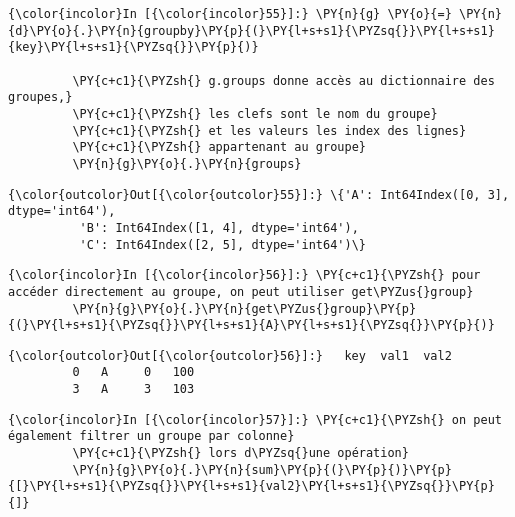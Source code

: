     \begin{Verbatim}[commandchars=\\\{\},frame=single,framerule=0.3mm,rulecolor=\color{cellframecolor}]
{\color{incolor}In [{\color{incolor}55}]:} \PY{n}{g} \PY{o}{=} \PY{n}{d}\PY{o}{.}\PY{n}{groupby}\PY{p}{(}\PY{l+s+s1}{\PYZsq{}}\PY{l+s+s1}{key}\PY{l+s+s1}{\PYZsq{}}\PY{p}{)}
         
         \PY{c+c1}{\PYZsh{} g.groups donne accès au dictionnaire des groupes,}
         \PY{c+c1}{\PYZsh{} les clefs sont le nom du groupe}
         \PY{c+c1}{\PYZsh{} et les valeurs les index des lignes}
         \PY{c+c1}{\PYZsh{} appartenant au groupe}
         \PY{n}{g}\PY{o}{.}\PY{n}{groups}
\end{Verbatim}


\begin{Verbatim}[commandchars=\\\{\},frame=single,framerule=0.3mm,rulecolor=\color{cellframecolor}]
{\color{outcolor}Out[{\color{outcolor}55}]:} \{'A': Int64Index([0, 3], dtype='int64'),
          'B': Int64Index([1, 4], dtype='int64'),
          'C': Int64Index([2, 5], dtype='int64')\}
\end{Verbatim}
            
    \begin{Verbatim}[commandchars=\\\{\},frame=single,framerule=0.3mm,rulecolor=\color{cellframecolor}]
{\color{incolor}In [{\color{incolor}56}]:} \PY{c+c1}{\PYZsh{} pour accéder directement au groupe, on peut utiliser get\PYZus{}group}
         \PY{n}{g}\PY{o}{.}\PY{n}{get\PYZus{}group}\PY{p}{(}\PY{l+s+s1}{\PYZsq{}}\PY{l+s+s1}{A}\PY{l+s+s1}{\PYZsq{}}\PY{p}{)}
\end{Verbatim}


\begin{Verbatim}[commandchars=\\\{\},frame=single,framerule=0.3mm,rulecolor=\color{cellframecolor}]
{\color{outcolor}Out[{\color{outcolor}56}]:}   key  val1  val2
         0   A     0   100
         3   A     3   103
\end{Verbatim}
            
    \begin{Verbatim}[commandchars=\\\{\},frame=single,framerule=0.3mm,rulecolor=\color{cellframecolor}]
{\color{incolor}In [{\color{incolor}57}]:} \PY{c+c1}{\PYZsh{} on peut également filtrer un groupe par colonne}
         \PY{c+c1}{\PYZsh{} lors d\PYZsq{}une opération}
         \PY{n}{g}\PY{o}{.}\PY{n}{sum}\PY{p}{(}\PY{p}{)}\PY{p}{[}\PY{l+s+s1}{\PYZsq{}}\PY{l+s+s1}{val2}\PY{l+s+s1}{\PYZsq{}}\PY{p}{]}
\end{Verbatim}


